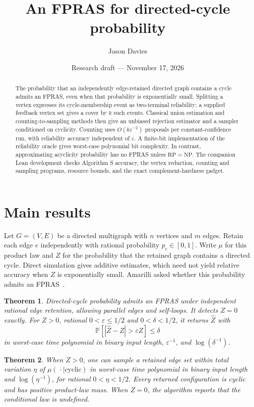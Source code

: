 \documentclass[11pt]{article}
\title{An FPRAS for directed-cycle probability}
\author{Jason Davies}
\date{Research draft --- November 17, 2026}
\newtheorem{theorem}{Theorem}
\newcommand{\Prb}{\mathbb{P}}
\begin{document}
\maketitle
\begin{abstract}
The probability that an independently edge-retained directed graph contains
a cycle admits an FPRAS, even when that probability is exponentially small.
Splitting a vertex expresses its cycle-membership event as two-terminal
reliability; a supplied feedback vertex set gives a cover by $k$ such events.
Classical union estimation and counting-to-sampling methods then give an
unbiased rejection estimator and a sampler conditioned on cyclicity.
Counting uses $O(k\varepsilon^{-2})$ proposals per
constant-confidence run, with reliability accuracy independent of
$\varepsilon$. A finite-bit implementation of the reliability oracle gives
worst-case polynomial bit complexity. In contrast, approximating acyclicity
probability has no FPRAS unless $\mathrm{RP}=\mathrm{NP}$. The companion Lean
development checks Algorithm S accuracy, the vertex reduction, counting and
sampling programs, resource bounds, and the exact complement-hardness gadget.
\end{abstract}

\section{Main results}
Let $G=(V,E)$ be a directed multigraph with $n$ vertices and $m$ edges.
Retain each edge $e$ independently with rational probability $p_e\in[0,1]$.
Write $\mu$ for this product law and $Z$ for the probability that the retained
graph contains a directed cycle. Direct simulation gives additive estimates,
which need not yield relative accuracy when $Z$ is exponentially small.
Amarilli asked whether this probability admits an FPRAS~\cite{question,probgraphs}.

\begin{theorem}\label{thm:fpras}
Directed-cycle probability admits an FPRAS under independent rational edge
retention, allowing parallel edges and self-loops. It detects $Z=0$ exactly.
For $Z>0$, rational $0<\varepsilon\leq1/2$ and $0<\delta<1/2$, it returns
$\widehat Z$ with
\[
 \Prb[|\widehat Z-Z|>\varepsilon Z]\leq\delta
\]
in worst-case time polynomial in binary input length, $\varepsilon^{-1}$,
and $\log(\delta^{-1})$.
\end{theorem}

\begin{theorem}\label{thm:sample}
When $Z>0$, one can sample a retained edge set within total variation
$\eta$ of $\mu(\,\cdot\mid\text{cyclic})$ in worst-case time polynomial in
binary input length and $\log(\eta^{-1})$, for rational $0<\eta<1/2$.
Every returned configuration is cyclic and has positive product-law mass.
When $Z=0$, the algorithm reports that the conditional law is undefined.
\end{theorem}
\end{document}
